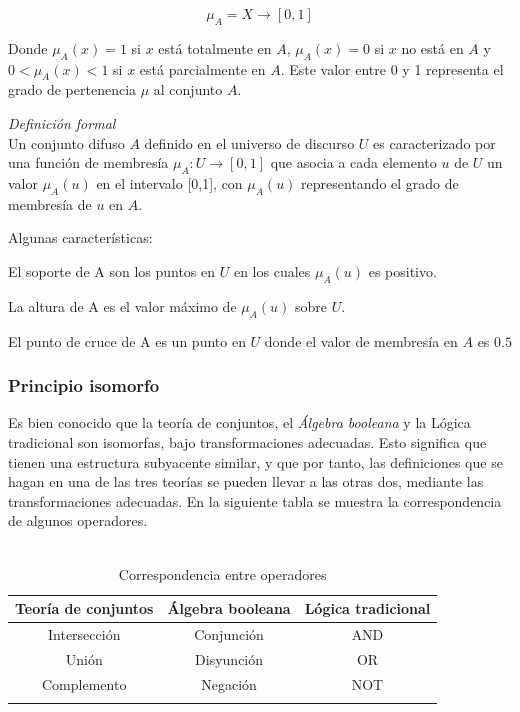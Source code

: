 \begin{displaymath}
\mu_A = X \rightarrow \left[ 0,1 \right]
\end{displaymath}


Donde $\mu_A(x) = 1$ si $x$ está totalmente en $A$,
$\mu_A(x) = 0$ si $x$ no está en $A$
y $ 0 < \mu_A(x) < 1 $ si $x$ está parcialmente en $A$.
Este valor entre 0 y 1 representa el grado de pertenencia $\mu$ al conjunto $A$.


\textit{Definición formal}\\
Un conjunto difuso $A$ definido en el universo de discurso $U$ es caracterizado por una función de membresía $\mu_A : U \rightarrow [0,1]$ que asocia a cada elemento $u$ de $U$ un valor $\mu_A(u)$ en el intervalo [0,1], con $\mu_A(u)$ representando el grado de membresía de $u$ en $A$.

Algunas características:
{\setlength{\baselineskip}{0.7\baselineskip}\begin{description}
	\item El soporte de A son los puntos en $U$ en los cuales $\mu_A(u)$ es positivo.
	\item La altura de A es el valor máximo de $\mu_A(u)$ sobre $U$.
	\item El punto de cruce de A es un punto en $U$ donde el valor de membresía en $A$ es $0.5$
\end{description}}





\subsubsection{Principio isomorfo}

Es bien conocido que la teoría de conjuntos, el \textit{Álgebra booleana} y la Lógica tradicional son isomorfas, bajo transformaciones adecuadas. Esto significa que tienen una estructura subyacente similar, y que por tanto, las definiciones que se hagan en una de las tres teorías se pueden llevar a las otras dos, mediante las transformaciones adecuadas.
En la siguiente tabla se muestra la correspondencia de algunos operadores.\\\\


\begin{longtable}{|c|c|c|} 
	\hline
	Teoría de conjuntos & Álgebra booleana & Lógica tradicional \\ \hline
	Intersección & Conjunción & AND \\ \hline
	Unión & Disyunción & OR \\ \hline
	Complemento & Negación & NOT \\ \hline
	\caption{Correspondencia entre operadores} \label{table:tblop}
\end{longtable}

